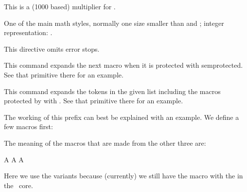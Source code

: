 \stopnewprimitive

\startnewprimitive[title={\prm {scriptspacebetweenfactor}}]

This is a (1000 based) multiplier for .

\stopnewprimitive

\startoldprimitive[title={\prm {scriptstyle}}]

One of the main math styles, normally one size smaller than 
and ; integer representation: \the\scriptstyle.

\stopoldprimitive

\startoldprimitive[title={\prm {scrollmode}}]

    This directive omits error stops.

\stopoldprimitive

\startnewprimitive[title={\prm {semiexpand}}]

This command expands the next macro when it is protected with \prm
{semprotected}. See that primitive there for an example.

\stopnewprimitive

\startnewprimitive[title={\prm {semiexpanded}}]

This command expands the tokens in the given list including the macros protected
by with . See that primitive there for an example.

\stopnewprimitive

\startnewprimitive[title={\prm {semiprotected}}]

\startbuffer
              \def\TestA{A}
\semiprotected{}
    \protected{}

\edef\TestD{\TestA           \TestB           \TestC}
\edef\TestE{\TestA\semiexpand\TestB\semiexpand\TestC}
\edef\TestF{\TestA\expand    \TestB\expand    \TestC}

\edef\TestG{\normalexpanded    {\TestA\TestB\TestC}}
\edef\TestH{\normalsemiexpanded{\TestA\TestB\TestC}}
\stopbuffer

The working of this prefix can best be explained with an example. We define a few
macros first:

\typebuffer \getbuffer

The meaning of the macros that are made from the other three are:

\startbuffer
\meaningless\TestD
\meaningless\TestE
\meaningless\TestF
\meaningless\TestG
\meaningless\TestH
\stopbuffer

Here we use the  variants because (currently) we still have the
macro with the \type {\expanded} in the \CONTEXT\ core.

